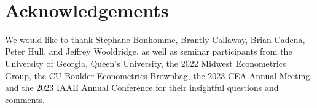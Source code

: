 \documentclass[12pt]{article}
\begin{document}
\newpage~\section*{Acknowledgements}

We would like to thank Stephane Bonhomme, Brantly Callaway, Brian Cadena, Peter Hull, and Jeffrey Wooldridge, as well as seminar participants from the University of Georgia, Queen's University, the 2022 Midwest Econometrics Group, the CU Boulder Econometrics Brownbag, the 2023 CEA Annual Meeting, and the 2023 IAAE Annual Conference for their insightful questions and comments.


\end{document}
